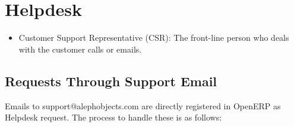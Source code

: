 %
%
%
%
%


\section{Helpdesk}
\begin{itemize}
\item Customer Support Representative (CSR): The front-line person who deals with the customer calls or emails.

\end{itemize}

\subsection{Requests Through Support Email}

Emails to support@alephobjects.com are directly registered in OpenERP as Helpdesk request. The process to handle these is as follows:

